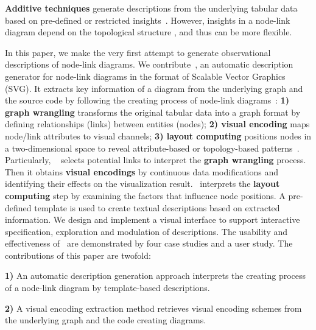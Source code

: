 \textbf{Additive techniques} generate descriptions from the underlying tabular data based on pre-defined or restricted insights~\cite{DBLP:journals/pvldb/DemiralpHPP17, DBLP:journals/tvcg/WangSZCXMZ20, DBLP:conf/apvis/LiuXHWY20, DBLP:conf/chi/KimHA20}. However, insights in a node-link diagram depend on the topological structure 
, and thus
can be more flexible.


In this paper, we make the very first attempt to generate observational descriptions of node-link diagrams.
We contribute~\textit{\ApproachName}, an automatic description generator for node-link diagrams in the format of Scalable Vector Graphics (SVG). 
It extracts key information of a diagram from the underlying graph and the source code by following the creating process of node-link diagrams~\cite{DBLP:journals/cgf/SpritzerBDFF15, tvcg/RomatAP21}:
\textbf{1) graph wrangling} transforms the original tabular data into a graph format by defining relationships (links) between entities (nodes);
\textbf{2) visual encoding} maps node/link attributes to visual channels;
\textbf{3) layout computing} positions nodes in a two-dimensional space to reveal attribute-based or topology-based patterns~\cite{DBLP:journals/cgf/NobreMSL19}.
Particularly, \ApproachName~
selects potential links to interpret the \textbf{graph wrangling} process.
Then it obtains \textbf{visual encodings} by continuous data modifications and identifying their effects on the visualization result.
\ApproachName~interprets the \textbf{layout computing} step by examining the factors that influence node positions.
A pre-defined template is used to create textual descriptions based on extracted information. 
We design and implement a visual interface to support interactive specification, exploration and modulation of descriptions.
The usability and effectiveness of \ApproachName~are demonstrated by four case studies and a user study.
The contributions of this paper are twofold:

\noindent \textbf{1)} An automatic description generation approach interprets the creating process of a node-link diagram by template-based descriptions.

\noindent \textbf{2)} A visual encoding extraction method retrieves visual encoding schemes from the underlying graph and the code creating diagrams.